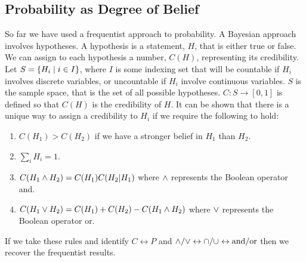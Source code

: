     \subsection{Probability as Degree of Belief}
    So far we have used a frequentist approach to probability.
    A Bayesian approach involves hypotheses.
    A hypothesis is a statement, \(H\), that is either true or false.
    We can assign to each hypothesis a number, \(C(H)\), representing its credibility.
    Let \(S = \{H_i\mid i\in I\}\), where \(I\) is some indexing set that will be countable if \(H_i\) involves discrete variables, or uncountable if \(H_i\) involve continuous variables. \(S\) is the sample space, that is the set of all possible hypotheses. \(C\colon S \rightarrow [0, 1]\) is defined so that \(C(H)\) is the credibility of \(H\).
    It can be shown that there is a unique way to assign a credibility to  \(H_i\) if we require the following to hold:
    \begin{enumerate}
        \item \(C(H_1) > C(H_2)\) if we have a stronger belief in \(H_1\) than \(H_2\).
        \item \(\sum_i H_i = 1\).
        \item \(C(H_1\wedge H_2) = C(H_1)C(H_2|H_1)\) where \(\wedge\) represents the Boolean operator and.
        \item \(C(H_1\vee H_2) = C(H_1) + C(H_2) - C(H_1\wedge H_2)\) where \(\vee\) represents the Boolean operator or.
    \end{enumerate}
    If we take these rules and identify \(C \leftrightarrow P\) and \(\wedge/\vee\leftrightarrow \cap/\cup \leftrightarrow \text{and}/\text{or}\) then we recover the frequentist results.